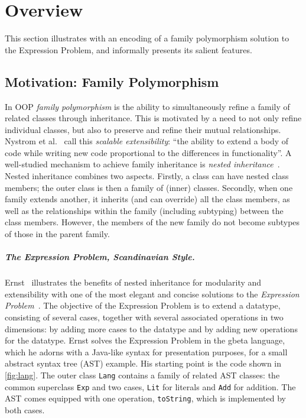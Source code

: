 
\section{Overview}
\label{sec:overview}

This section illustrates \name with an encoding of a family polymorphism
solution to the Expression Problem, and informally presents its salient
features.

\subsection{Motivation: Family Polymorphism}

In OOP \emph{family polymorphism} is the ability to
simultaneously refine a family of related classes through inheritance. This is
motivated by a need to not only refine individual classes, but also to preserve
and refine their mutual relationships. Nystrom et al.~\cite{Nystrom_2004} call this
\emph{scalable extensibility}: ``the ability to extend a body of code while
writing new code proportional to the differences in functionality''.
%
A well-studied mechanism to achieve family inheritance is \emph{nested
inheritance}~\cite{Nystrom_2004}. Nested inheritance combines two aspects.
Firstly, a class can have nested class members; the outer class is then a
family of (inner) classes. Secondly, when one family extends another, it
inherits (and can override) all the class members, as well as the relationships
within the family (including subtyping) between the class members. However,
the members of the new family do not become subtypes of those in the parent family.

\subparagraph{The Expression Problem, Scandinavian Style.}
Ernst~\cite{Ernst_2001} illustrates the benefits of nested inheritance for modularity
and extensibility with one of the most elegant and concise solutions to the
\emph{Expression Problem}~\cite{wadler1998expression}. The objective of the
Expression Problem is to extend a datatype, consisting of several cases,
together with several associated operations in two dimensions: by adding more
cases to the datatype and by adding new operations for the datatype.
Ernst solves the Expression Problem in the gbeta language,
which he adorns with a Java-like syntax for presentation purposes, for a small
abstract syntax tree (AST) example. His starting point is the code shown in
\cref{fig:lang}. The outer class \lstinline{Lang} contains a family of related
AST classes: the common superclass \lstinline{Exp} and two cases,
\lstinline{Lit} for literals and \lstinline{Add} for addition. The AST comes
equipped with one operation, \lstinline{toString}, which is implemented by both
cases.


